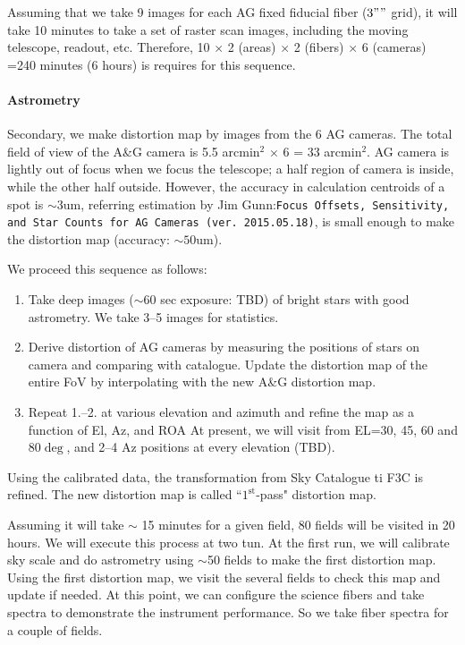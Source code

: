 Assuming that we take 9 images for each AG fixed fiducial fiber ($3" \time 3"$ grid), it will take 10 minutes to take a set of raster scan images, including the moving telescope, readout, etc.
Therefore, 10 $\times$ 2 (areas) $\times$ 2 (fibers) $\times$ 6 (cameras) =240 minutes (6 hours) is requires for this sequence.


\paragraph{Astrometry}
Secondary, we make distortion map by images from the 6 AG cameras.
The total field of view of the A\&G camera is 5.5 arcmin$^2$ $\times$ 6 = 33 arcmin$^2$.
AG camera is lightly out of focus when we focus the telescope; a half region of camera is inside, while the other half outside.
However, the accuracy in calculation centroids of a spot is $\sim$3um, referring estimation by Jim Gunn:{\tt Focus Offsets, Sensitivity, and Star Counts for AG Cameras (ver. 2015.05.18)}, is small enough to make the distortion map (accuracy: $\sim 50$um).

We proceed this sequence as follows:
\begin{enumerate}
\item Take deep images ($\sim 60$ sec exposure: TBD) of bright stars with good astrometry.
We take 3--5 images for statistics.
\item Derive distortion of AG cameras by measuring the positions of stars on camera and comparing with catalogue.
Update the distortion map of the entire FoV by interpolating with the new A\&G distortion map.
\item Repeat 1.--2. at various elevation and azimuth and refine the map as a function of El, Az, and ROA
At present, we will visit from EL=30, 45, 60 and 80$\deg$, and 2--4 Az positions at every elevation (TBD).
\end{enumerate}
Using the calibrated data, the transformation from Sky Catalogue ti F3C is refined.
The new distortion map is called ``$1^\mathrm{st}$-pass" distortion map.

Assuming it will take $\sim$ 15 minutes for a given field, 80 fields will be visited in 20 hours.
We will execute this process at two tun.
At the first run, we will calibrate sky scale and do astrometry using $\sim$50 fields to make the first distortion map.
Using the first distortion map, we visit the several fields to check this map and update if needed.
At this point, we can configure the science fibers and take spectra to demonstrate the instrument performance.
So we take fiber spectra for a couple of fields.

